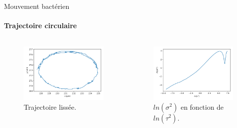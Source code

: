 \documentclass[11pt]{beamer}
\begin{document}
\begin{frame}{Mouvement bactérien}
\framesubtitle{Trajectoire circulaire}
\begin{columns}
\begin{figure}
\centering
\includegraphics[width=1\linewidth]{traj_lissee_1.png}
\caption{Trajectoire lissée.}
\end{figure}

\begin{figure}
\includegraphics[width=1\linewidth]{dx2_t2_log_5.png}
\caption{$ln(\sigma ^2)$ en fonction de $ln(\tau ^2)$.}
\end{figure}

\end{columns}
\end{frame}
\end{document}
